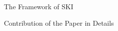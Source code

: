 \documentclass[presentation]{beamer} %
\begin{document}
{\begin{frame}{The Framework of SKI}
\end{frame}


%
%
%
%
%
%
%




\begin{frame}{Contribution of the Paper in Details}


\end{frame}}
\end{document}
